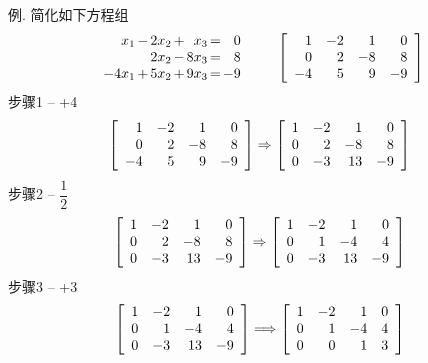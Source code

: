 \documentclass[UTF8,fontset=ubuntu]{ctexart}
\theoremstyle{plain}
\theoremstyle{nonumberplain}
\theoremstyle{empty}
\begin{document}
例. 简化如下方程组
\[\begin{array}{r@{\hspace{1.5pt}}l@{\hspace{1.5pt}}r@{\hspace{1.5pt}}l@{\hspace{1.5pt}}r@{\hspace{1.5pt}}l@{\hspace{1.5pt}}r}
x_1 & - & 2x_2 & + &  x_3 & = & 0\\
	& 	& 2x_2 & - & 8x_3 & = & 8\\
-4x_1 & + & 5x_2 & + & 9x_3 & = & -9
\end{array}\qquad\left[\begin{array}{r r r r}
	1 & -2 & 1 & 0\\
	0 & 2 & -8 & 8\\
	-4 & 5 & 9 & -9
\end{array}\right]\]
步骤1 -- +4
\[\left[\begin{array}{r r r r}
    1 & -2 & 1 & 0\\
    0 & 2 & -8 & 8\\
    -4 & 5 & 9 & -9
\end{array}\right] \Rightarrow \left[\begin{array}{r r r r}
    1 & -2 & 1 & 0\\
    0 & 2 & -8 & 8\\
    0 & -3 & 13 & -9
\end{array}\right]\]
步骤2 -- $\dfrac{1}{2}$
\[\left[\begin{array}{r r r r}
    1 & -2 & 1 & 0\\
    0 & 2 & -8 & 8\\
    0 & -3 & 13 & -9
\end{array}\right] \Rightarrow \left[\begin{array}{r r r r}
    1 & -2 & 1 & 0\\
    0 & 1 & -4 & 4\\
    0 & -3 & 13 & -9
\end{array}\right]\]
步骤3 -- +3
\[\left[\begin{array}{r r r r}
    1 & -2 & 1 & 0\\
    0 & 1 & -4 & 4\\
    0 & -3 & 13 & -9
\end{array}\right] \Longrightarrow \left[\begin{array}{r r r r}
	1 & -2 & 1 & 0\\
	0 & 1 & -4 & 4\\
	0 & 0 & 1 & 3
\end{array}\right]\]
\end{document}
